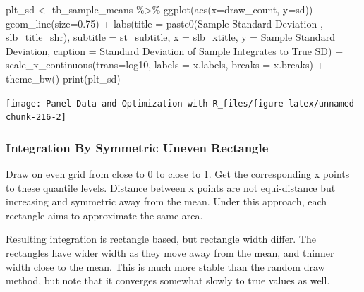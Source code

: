 \documentclass[
]{book}
\newenvironment{Shaded}{\begin{snugshade}}{\end{snugshade}}
\newcommand{\AttributeTok}[1]{\textcolor[rgb]{0.77,0.63,0.00}{#1}}
\newcommand{\FloatTok}[1]{\textcolor[rgb]{0.00,0.00,0.81}{#1}}
\newcommand{\FunctionTok}[1]{\textcolor[rgb]{0.00,0.00,0.00}{#1}}
\newcommand{\NormalTok}[1]{#1}
\newcommand{\OtherTok}[1]{\textcolor[rgb]{0.56,0.35,0.01}{#1}}
\newcommand{\SpecialCharTok}[1]{\textcolor[rgb]{0.00,0.00,0.00}{#1}}
\newcommand{\StringTok}[1]{\textcolor[rgb]{0.31,0.60,0.02}{#1}}
\begin{document}
\begin{Shaded}
\begin{Highlighting}[]
\NormalTok{plt\_sd }\OtherTok{\textless{}{-}}\NormalTok{ tb\_sample\_means }\SpecialCharTok{\%\textgreater{}\%}
  \FunctionTok{ggplot}\NormalTok{(}\FunctionTok{aes}\NormalTok{(}\AttributeTok{x=}\NormalTok{draw\_count, }\AttributeTok{y=}\NormalTok{sd)) }\SpecialCharTok{+}
  \FunctionTok{geom\_line}\NormalTok{(}\AttributeTok{size=}\FloatTok{0.75}\NormalTok{) }\SpecialCharTok{+}
  \FunctionTok{labs}\NormalTok{(}\AttributeTok{title =} \FunctionTok{paste0}\NormalTok{(}\StringTok{\textquotesingle{}Sample Standard Deviation \textquotesingle{}}\NormalTok{, slb\_title\_shr),}
       \AttributeTok{subtitle =}\NormalTok{ st\_subtitle,}
       \AttributeTok{x =}\NormalTok{ slb\_xtitle,}
       \AttributeTok{y =} \StringTok{\textquotesingle{}Sample Standard Deviation\textquotesingle{}}\NormalTok{,}
       \AttributeTok{caption =} \StringTok{\textquotesingle{}Standard Deviation of Sample Integrates to True SD\textquotesingle{}}\NormalTok{) }\SpecialCharTok{+}
  \FunctionTok{scale\_x\_continuous}\NormalTok{(}\AttributeTok{trans=}\StringTok{\textquotesingle{}log10\textquotesingle{}}\NormalTok{, }\AttributeTok{labels =}\NormalTok{ x.labels, }\AttributeTok{breaks =}\NormalTok{ x.breaks) }\SpecialCharTok{+}
  \FunctionTok{theme\_bw}\NormalTok{()}
\FunctionTok{print}\NormalTok{(plt\_sd)}
\end{Highlighting}
\end{Shaded}

\begin{center}\texttt{[image: Panel-Data-and-Optimization-with-R\_files/figure-latex/unnamed-chunk-216-2]} \end{center}

\hypertarget{integration-by-symmetric-uneven-rectangle}{%
\subsubsection{Integration By Symmetric Uneven Rectangle}\label{integration-by-symmetric-uneven-rectangle}}

Draw on even grid from close to 0 to close to 1. Get the corresponding x points to these quantile levels. Distance between x points are not equi-distance but increasing and symmetric away from the mean. Under this approach, each rectangle aims to approximate the same area.

Resulting integration is rectangle based, but rectangle width differ. The rectangles have wider width as they move away from the mean, and thinner width close to the mean. This is much more stable than the random draw method, but note that it converges somewhat slowly to true values as well.
\end{document}
